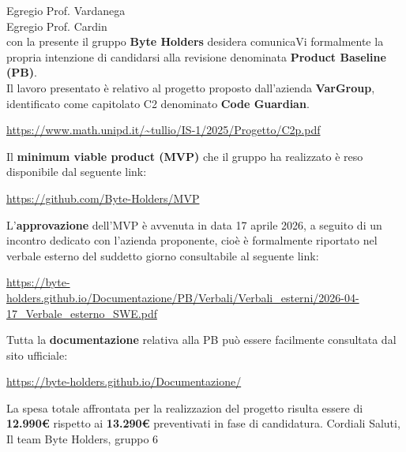 \documentclass[a4paper, 12pt]{article}
\begin{document}
\newpage
\large \noindent Egregio Prof. Vardanega\\
Egregio Prof. Cardin\\[1cm]
\noindent con la presente il gruppo \textbf{Byte Holders} desidera comunicaVi formalmente la propria intenzione di candidarsi alla revisione denominata \textbf{Product Baseline (PB)}.\\ Il lavoro presentato è relativo al progetto proposto dall'azienda \textbf{VarGroup}, identificato come capitolato C2 denominato \textbf{Code Guardian}.
\vspace{0.3cm}
\begin{center}
    \url{https://www.math.unipd.it/~tullio/IS-1/2025/Progetto/C2p.pdf}
\end{center}
\vspace{0.3cm}
Il \textbf{minimum viable product (MVP)} che il gruppo ha realizzato è reso disponibile dal seguente link:
\vspace{0.3cm}
\begin{center}
    \url{https://github.com/Byte-Holders/MVP}
\end{center}
\vspace{0.3cm}
L'\textbf{approvazione} dell'MVP è avvenuta in data 17 aprile 2026, a seguito di un incontro dedicato con l'azienda proponente, cioè è formalmente riportato nel verbale esterno del suddetto giorno consultabile al seguente link:
\vspace{0.3cm}
\begin{center}
    \url{https://byte-holders.github.io/Documentazione/PB/Verbali/Verbali_esterni/2026-04-17_Verbale_esterno_SWE.pdf}
\end{center}
\vspace{0.3cm}
Tutta la \textbf{documentazione} relativa alla PB può essere facilmente consultata dal sito ufficiale:
\vspace{0.3cm}
\begin{center}
    \url{https://byte-holders.github.io/Documentazione/}
\end{center}
\vspace{0.3cm}

\noindent
La spesa totale affrontata per la realizzazion del progetto risulta essere di \textbf{12.990€} rispetto ai \textbf{13.290€} preventivati in fase di candidatura.
\vspace{0.5cm}
\noindent
Cordiali Saluti,\\
Il team Byte Holders, gruppo 6
\end{document}
